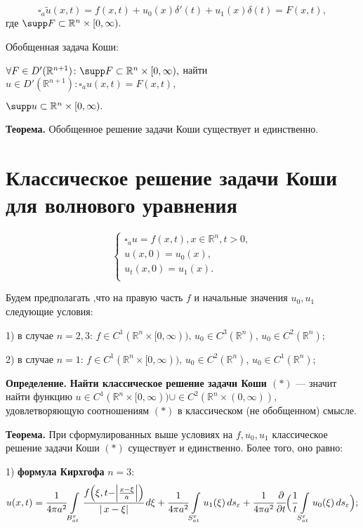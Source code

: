 \documentclass[12pt,a4paper,draft]{article}
\DeclareRobustCommand*{\т}{~--- }
\DeclareRobustCommand*{\ч}{~-- }
\begin{document}
$$\square_a \tilde u(x,t)=f(x,t)+u_0(x)\delta'(t)+u_1(x)\delta(t)=F(x,t),$$
где $\supp F\subset \mathbb R^n\times[0,\infty).$

Обобщенная задача Коши:

$\forall F\in D'(\mathbb R^{n+1})\colon \supp F\subset \mathbb
R^n\times[0,\infty),$ найти $u\in D'(\mathbb R^{n+1})\colon
\square_a u(x,t)=F(x,t),$

 $\supp u\subset \mathbb
R^n\times[0,\infty).$

\textbf{Теорема.} Обобщенное решение задачи Коши существует и
единственно.

\section{Классическое решение задачи Коши\\для волнового уравнения}

$$\left\{%
\begin{array}{ll}
    \square_a u=f(x,t),x\in \mathbb R^n,t>0,\\
    u(x,0)=u_0(x),\\
    u_t(x,0)=u_1(x). \\
\end{array}%
\right.$$

Будем предполагать ,что на правую часть $f$ и начальные значения
$u_0,u_1$ следующие условия:

1) в случае $n=2,3$: $f\in C^1(\mathbb R^n\times[0,\infty)),\,
u_0\in C^3(\mathbb R^n),\,u_0\in C^2(\mathbb R^n);$

2) в случае $n=1$: $f\in C^1(\mathbb R^n\times[0,\infty)),\,
u_0\in C^2(\mathbb R^n),\,u_0\in C^1(\mathbb R^n);$

\textbf{Определение.} \textbf{Найти классическое решение задачи
Коши $(*)$} --- значит найти функцию $u\in C^1(\mathbb
R^n\times[0,\infty))\cup\in C^2(\mathbb R^n\times(0,\infty)),$
удовлетворяющую соотношениям $(*)$ в классическом (не обобщенном)
смысле.

\textbf{Теорема.} При сформулированных выше условиях на
$f,u_0,u_1$ классическое решение задачи Коши $(*)$ существует и
единственно. Более того, оно равно:

1) \textbf{формула Кирхгофа} $n=3$:
$$u(x,t)=
\cfrac1{4\pi
a^2}\int\limits_{B_{at}^x}\cfrac{f\Bigl(\xi,t-\Bigr|\frac{x-\xi}a\Bigl|\Bigr)}{|\,x-\xi|}\,d\xi+
\cfrac1{4\pi a^2} \int\limits_{S_{at}^x}u_1(\xi)\,
ds_{\varepsilon}+ \cfrac1{4\pi a^2}\, \cfrac{\partial}{\partial
t}\Bigl(\cfrac1t\int\limits_{S_{at}^x}u_0(\xi)\,
ds_{\varepsilon}\Bigr);$$
\end{document}
